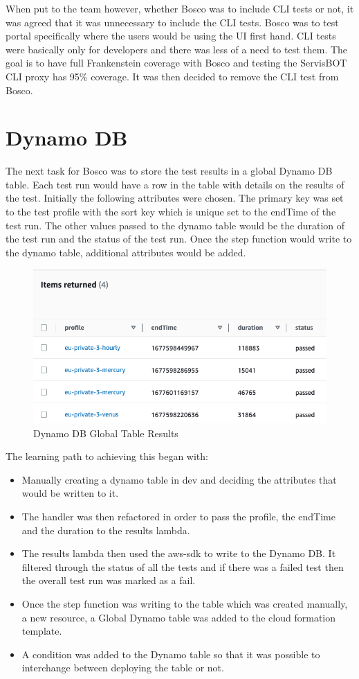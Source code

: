 \documentclass[12pt,a4paper,titlepage]{report}
\begin{document}
When put to the team however, whether Bosco was to include CLI tests or not, it was agreed that it was unnecessary to include the CLI tests. Bosco was to test portal specifically where the users would 
be using the UI first hand. CLI tests were basically only for developers and there was less of a need to test them. The goal is to have full Frankenstein coverage with Bosco and testing the ServisBOT CLI proxy has 95\% coverage. 
It was then decided to remove the CLI test from Bosco. 

\section{Dynamo DB}
The next task for Bosco was to store the test results in a global Dynamo DB table. 
Each test run would have a row in the table with details on the results of the test. 
Initially the following attributes were chosen. The primary key was set to the test profile with the sort key which is unique set to the endTime of the test run. 
The other values passed to the dynamo table would be the duration of the test run and the status of the test run. Once the step function would write to the dynamo table, additional attributes would be added.

\begin{figure}[ht]
  \centering
  \includegraphics[width=15cm]{./diagrams/dynamodb.png}
  \caption{Dynamo DB Global Table Results}
 \end{figure}

The learning path to achieving this began with:
\begin{itemize}
\item Manually creating a dynamo table in dev and deciding the attributes that would be written to it.
\item The handler was then refactored in order to pass the profile, the endTime and the duration to the results lambda.
\item The results lambda then used the aws-sdk to write to the Dynamo DB. It filtered through the status of all the tests and if there was a failed test then the overall test run was marked as a fail.
\item Once the step function was writing to the table which was created manually, a new resource, a Global Dynamo table was added to the cloud formation template.
\item A condition was added to the Dynamo table so that it was possible to interchange between deploying the table or not.
\end{itemize}
\end{document}
